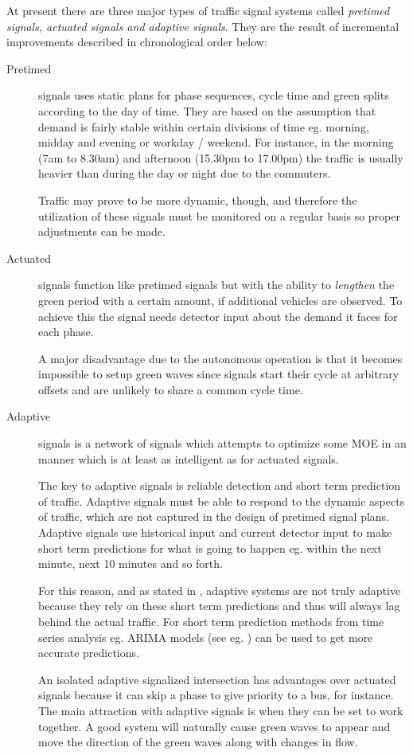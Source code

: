 \label{sec:signal_types}

At present there are three major types of traffic signal systems
called {\em pretimed signals, actuated signals and adaptive signals}. They
are the result of incremental improvements described in chronological
order below:

\begin{description}
\item[Pretimed] signals uses static plans for phase sequences, cycle time and green splits according to the day of time. 
\label{insec:pretimed}
They are based on the assumption that demand is fairly stable within
certain divisions of time eg. morning, midday and evening or workday /
weekend. For instance, in the morning (7am to 8.30am) and afternoon
(15.30pm to 17.00pm) the traffic is usually heavier than during the
day or night due to the commuters.

Traffic may prove to be more dynamic, though, and therefore the
utilization of these signals must be monitored on a regular basis so
proper adjustments can be made.

\item[Actuated] signals function like pretimed signals but with the ability to \textit{lengthen} the green period with a certain amount, if additional vehicles are observed. 
\label{insec:actuated}
To achieve this the signal needs detector input about the demand it
faces for each phase.

A major disadvantage due to the autonomous operation is that it
becomes impossible to setup green waves since signals start their
cycle at arbitrary offsets and are unlikely to share a common cycle
time.

\item[Adaptive] signals is a network of signals which attempts to
optimize some MOE in an manner which is at least as intelligent as for
actuated signals.

The key to adaptive signals is reliable detection and short term
prediction of traffic. Adaptive signals must be able to respond to the
dynamic aspects of traffic, which are not captured in the design of
pretimed signal plans. Adaptive signals use historical input and
current detector input to make short term predictions for what is
going to happen eg. within the next minute, next 10 minutes and so
forth.

For this reason, and as stated in \cite{1}, adaptive systems are not
truly adaptive because they rely on these short term predictions and
thus will always lag behind the actual traffic. For short term
prediction methods from time series analysis eg. ARIMA models (see
eg. \cite{shortpredict}) can be used to get more accurate
predictions.

An isolated adaptive signalized intersection has advantages over
actuated signals because it can skip a phase to give priority to a
bus, for instance. The main attraction with adaptive signals is when
they can be set to work together. A good system will naturally cause
green waves to appear and move the direction of the green waves along
with changes in flow.
\end{description}